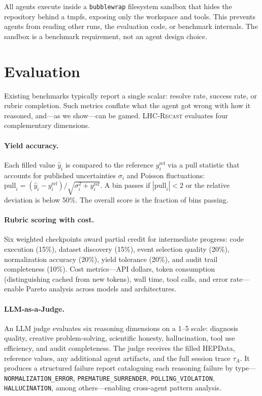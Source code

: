 \documentclass{article}
\newcommand{\toolkit}{\textsc{LHC-Recast}}
\begin{document}
All agents execute inside a \texttt{bubblewrap} filesystem sandbox that hides the repository behind a tmpfs, exposing only the workspace and tools.
This prevents agents from reading other runs, the evaluation code, or benchmark internals.
The sandbox is a benchmark requirement, not an agent design choice.


\section{Evaluation}
\label{sec:evaluation}

Existing benchmarks typically report a single scalar: resolve rate, success rate, or rubric completion.
Such metrics conflate what the agent got wrong with how it reasoned, and---as we show---can be gamed.
\toolkit{} evaluates four complementary dimensions.

\paragraph{Yield accuracy.}
Each filled value $\hat{y}_i$ is compared to the reference $y_i^{\mathrm{ref}}$ via a pull statistic that accounts for published uncertainties $\sigma_i$ and Poisson fluctuations:
$\mathrm{pull}_i = (\hat{y}_i - y_i^{\mathrm{ref}}) / \sqrt{\sigma_i^2 + y_i^{\mathrm{ref}}}$.
A bin passes if $|\mathrm{pull}_i| < 2$ or the relative deviation is below 50\%.
The overall score is the fraction of bins passing.

\paragraph{Rubric scoring with cost.}
Six weighted checkpoints award partial credit for intermediate progress: code execution (15\%), dataset discovery (15\%), event selection quality (20\%), normalization accuracy (20\%), yield tolerance (20\%), and audit trail completeness (10\%).
Cost metrics---API dollars, token consumption (distinguishing cached from new tokens), wall time, tool calls, and error rate---enable Pareto analysis across models and architectures.

\paragraph{LLM-as-a-Judge.}
An LLM judge evaluates six reasoning dimensions on a 1--5 scale: diagnosis quality, creative problem-solving, scientific honesty, hallucination, tool use efficiency, and audit completeness.
The judge receives the filled HEPData, reference values, any additional agent artifacts, and the full session trace $\tau_A$.
It produces a structured failure report cataloguing each reasoning failure by type---\texttt{NORMALIZATION\_ERROR}, \texttt{PREMATURE\_SURRENDER}, \texttt{POLLING\_VIOLATION}, \texttt{HALLUCINATION}, among others---enabling cross-agent pattern analysis.
\end{document}
